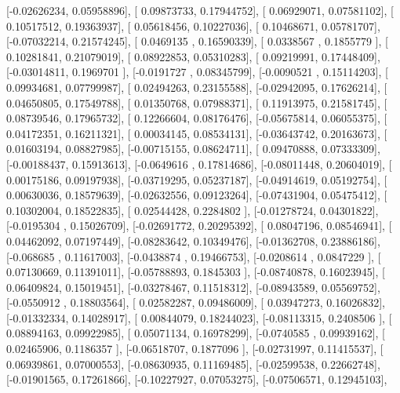 \documentclass{article}
\begin{document}
       [-0.02626234,  0.05958896],
       [ 0.09873733,  0.17944752],
       [ 0.06929071,  0.07581102],
       [ 0.10517512,  0.19363937],
       [ 0.05618456,  0.10227036],
       [ 0.10468671,  0.05781707],
       [-0.07032214,  0.21574245],
       [ 0.0469135 ,  0.16590339],
       [ 0.0338567 ,  0.1855779 ],
       [ 0.10281841,  0.21079019],
       [ 0.08922853,  0.05310283],
       [ 0.09219991,  0.17448409],
       [-0.03014811,  0.1969701 ],
       [-0.0191727 ,  0.08345799],
       [-0.0090521 ,  0.15114203],
       [ 0.09934681,  0.07799987],
       [ 0.02494263,  0.23155588],
       [-0.02942095,  0.17626214],
       [ 0.04650805,  0.17549788],
       [ 0.01350768,  0.07988371],
       [ 0.11913975,  0.21581745],
       [ 0.08739546,  0.17965732],
       [ 0.12266604,  0.08176476],
       [-0.05675814,  0.06055375],
       [ 0.04172351,  0.16211321],
       [ 0.00034145,  0.08534131],
       [-0.03643742,  0.20163673],
       [ 0.01603194,  0.08827985],
       [-0.00715155,  0.08624711],
       [ 0.09470888,  0.07333309],
       [-0.00188437,  0.15913613],
       [-0.0649616 ,  0.17814686],
       [-0.08011448,  0.20604019],
       [ 0.00175186,  0.09197938],
       [-0.03719295,  0.05237187],
       [-0.04914619,  0.05192754],
       [ 0.00630036,  0.18579639],
       [-0.02632556,  0.09123264],
       [-0.07431904,  0.05475412],
       [ 0.10302004,  0.18522835],
       [ 0.02544428,  0.2284802 ],
       [-0.01278724,  0.04301822],
       [-0.0195304 ,  0.15026709],
       [-0.02691772,  0.20295392],
       [ 0.08047196,  0.08546941],
       [ 0.04462092,  0.07197449],
       [-0.08283642,  0.10349476],
       [-0.01362708,  0.23886186],
       [-0.068685  ,  0.11617003],
       [-0.0438874 ,  0.19466753],
       [-0.0208614 ,  0.0847229 ],
       [ 0.07130669,  0.11391011],
       [-0.05788893,  0.1845303 ],
       [-0.08740878,  0.16023945],
       [ 0.06409824,  0.15019451],
       [-0.03278467,  0.11518312],
       [-0.08943589,  0.05569752],
       [-0.0550912 ,  0.18803564],
       [ 0.02582287,  0.09486009],
       [ 0.03947273,  0.16026832],
       [-0.01332334,  0.14028917],
       [ 0.00844079,  0.18244023],
       [-0.08113315,  0.2408506 ],
       [ 0.08894163,  0.09922985],
       [ 0.05071134,  0.16978299],
       [-0.0740585 ,  0.09939162],
       [ 0.02465906,  0.1186357 ],
       [-0.06518707,  0.1877096 ],
       [-0.02731997,  0.11415537],
       [ 0.06939861,  0.07000553],
       [-0.08630935,  0.11169485],
       [-0.02599538,  0.22662748],
       [-0.01901565,  0.17261866],
       [-0.10227927,  0.07053275],
       [-0.07506571,  0.12945103],
\end{document}
